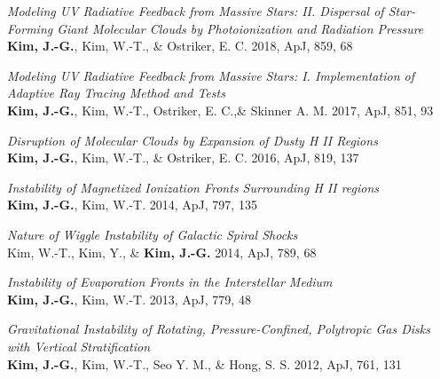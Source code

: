 \begin{benumerate}{16}
\item \textit{Modeling UV Radiative Feedback from Massive Stars: II. Dispersal
of Star-Forming Giant Molecular Clouds by Photoionization and Radiation
Pressure} \\ \textbf{Kim, J.-G.}, Kim, W.-T., \& Ostriker, E. C. 2018, ApJ, 859,
68
\item \textit{Modeling UV Radiative Feedback from Massive Stars: I.
Implementation of Adaptive Ray Tracing Method and Tests}\\ \textbf{Kim, J.-G.},
Kim, W.-T., Ostriker, E. C.,\& Skinner A. M. 2017, ApJ, 851, 93
\item \textit{Disruption of Molecular Clouds by Expansion of Dusty H II
Regions}\\ \textbf{Kim, J.-G.}, Kim, W.-T., \& Ostriker, E. C. 2016, ApJ, 819,
137
\item \textit{Instability of Magnetized Ionization Fronts Surrounding H II
regions}\\ \textbf{Kim, J.-G.}, Kim, W.-T. 2014, ApJ, 797, 135
\item \textit{Nature of Wiggle Instability of Galactic Spiral Shocks}\\ Kim,
W.-T., Kim, Y., \& \textbf{Kim, J.-G.} 2014, ApJ, 789, 68
\item \textit{Instability of Evaporation Fronts in the Interstellar Medium}\\
  \textbf{Kim, J.-G.}, Kim, W.-T. 2013, ApJ, 779, 48
\item \textit{Gravitational Instability of Rotating, Pressure-Confined,
    Polytropic Gas Disks with Vertical Stratification} \\ \textbf{Kim, J.-G.},
  Kim, W.-T., Seo Y. M., \& Hong, S. S. 2012, ApJ, 761, 131
\end{benumerate}

